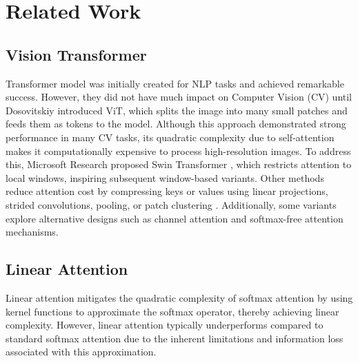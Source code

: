 \section{Related Work}

\subsection{Vision Transformer}
Transformer \cite{vaswani2017attention} model was initially created for NLP tasks and achieved remarkable success. However, they did not have much impact on Computer Vision (CV) until Dosovitskiy \etal \cite{rao2021dynamicvit} introduced ViT, which splits the image into many small patches and feeds them as tokens to the model. Although this approach demonstrated strong performance in many CV tasks, its quadratic complexity due to self-attention makes it computationally expensive to process high-resolution images. To address this, Microsoft Research proposed Swin Transformer \cite{liu2021swin}, which restricts attention to local windows, inspiring subsequent window-based variants. Other methods reduce attention cost by compressing keys or values using linear projections, strided convolutions, pooling, or patch clustering \cite{cai2023efficientvit,han2023flatten,han2024demystify,katharopoulos2020transformers,lu2024softmax,shen2021efficient}. Additionally, some variants explore alternative designs such as channel attention and softmax-free attention mechanisms.

\subsection{Linear Attention}
Linear attention \cite{shen2021efficient} mitigates the quadratic complexity of softmax attention by using kernel functions to approximate the softmax operator, thereby achieving linear complexity. However, linear attention typically underperforms compared to standard softmax attention due to the inherent limitations and information loss associated with this approximation.

